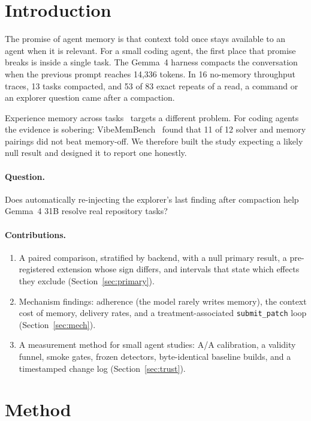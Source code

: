 \documentclass[11pt]{article}
\newcommand{\code}[1]{\texttt{#1}}
\begin{document}
\section{Introduction}
The promise of agent memory is that context told once stays available to an agent when it is relevant.
For a small coding agent, the first place that promise breaks is inside a single task. The Gemma~4
harness compacts the conversation when the previous prompt reaches 14,336 tokens. In 16 no-memory
throughput traces, 13 tasks compacted, and 53 of 83 exact repeats of a read, a command or an
explorer question came after a compaction.

Experience memory across tasks~\citep{shinn2023reflexion,zhao2023expel,ouyang2025reasoningbank}
targets a different problem. For coding agents the evidence is sobering:
VibeMemBench~\citep{fan2026vibemembench} found that 11 of 12 solver and memory pairings did not
beat memory-off. We therefore built the study expecting a likely null result and designed it to
report one honestly.

\paragraph{Question.} Does automatically re-injecting the explorer's last finding after compaction
help Gemma~4 31B resolve real repository tasks?

\paragraph{Contributions.}
\begin{enumerate}
\item A paired comparison, stratified by backend, with a null primary result, a
  pre-registered extension whose sign differs, and intervals that state which effects they exclude
  (Section~\ref{sec:primary}).
\item Mechanism findings: adherence (the model rarely writes memory), the context cost of memory,
  delivery rates, and a treatment-associated \code{submit\_patch} loop (Section~\ref{sec:mech}).
\item A measurement method for small agent studies: A/A calibration, a validity funnel, smoke
  gates, frozen detectors, byte-identical baseline builds, and a timestamped change log
  (Section~\ref{sec:trust}).
\end{enumerate}

\section{Method}
\end{document}
